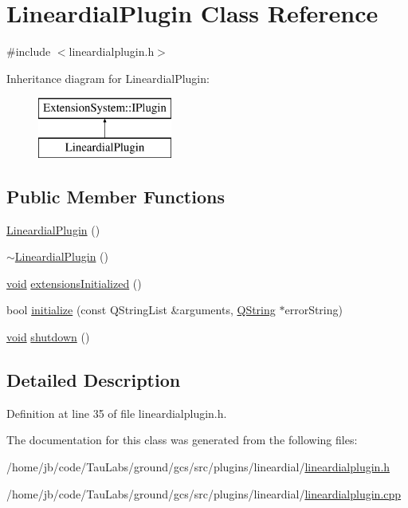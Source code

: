 \hypertarget{class_lineardial_plugin}{\section{\-Lineardial\-Plugin \-Class \-Reference}
\label{class_lineardial_plugin}
}


{\ttfamily \#include $<$lineardialplugin.\-h$>$}

\-Inheritance diagram for \-Lineardial\-Plugin\-:\begin{figure}[H]
\begin{center}
\leavevmode
\includegraphics[height=2.000000cm]{class_lineardial_plugin}
\end{center}
\end{figure}
\subsection*{\-Public \-Member \-Functions}
\begin{DoxyCompactItemize}
\item 
\hyperlink{group___linear_dial_plugin_gaeea9f7a365f52b1aef0da13809fabbc6}{\-Lineardial\-Plugin} ()
\item 
\hyperlink{group___linear_dial_plugin_ga945fcb418fce051d1998af913f4b6c6f}{$\sim$\-Lineardial\-Plugin} ()
\item 
\hyperlink{group___u_a_v_objects_plugin_ga444cf2ff3f0ecbe028adce838d373f5c}{void} \hyperlink{group___linear_dial_plugin_ga383081754a198481bde0fce79b7c01a9}{extensions\-Initialized} ()
\item 
bool \hyperlink{group___linear_dial_plugin_gab9c622169ddf91a97d6bd560b4f24f6f}{initialize} (const \-Q\-String\-List \&arguments, \hyperlink{group___u_a_v_objects_plugin_gab9d252f49c333c94a72f97ce3105a32d}{\-Q\-String} $\ast$error\-String)
\item 
\hyperlink{group___u_a_v_objects_plugin_ga444cf2ff3f0ecbe028adce838d373f5c}{void} \hyperlink{group___linear_dial_plugin_ga7a47ee89aef6192202148d71bf6a98a3}{shutdown} ()
\end{DoxyCompactItemize}


\subsection{\-Detailed \-Description}


\-Definition at line 35 of file lineardialplugin.\-h.



\-The documentation for this class was generated from the following files\-:\begin{DoxyCompactItemize}
\item 
/home/jb/code/\-Tau\-Labs/ground/gcs/src/plugins/lineardial/\hyperlink{lineardialplugin_8h}{lineardialplugin.\-h}\item 
/home/jb/code/\-Tau\-Labs/ground/gcs/src/plugins/lineardial/\hyperlink{lineardialplugin_8cpp}{lineardialplugin.\-cpp}\end{DoxyCompactItemize}
